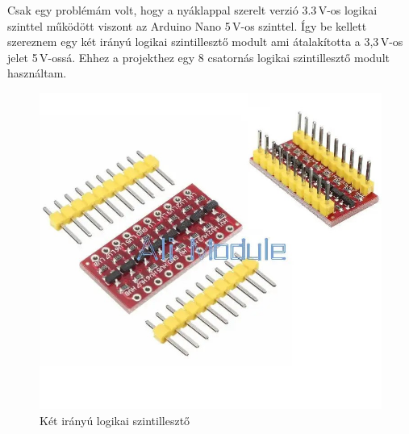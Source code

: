 \documentclass[]{thesis-ekf}
\theoremstyle{definition}
\theoremstyle{remark}
\begin{document}
Csak egy problémám volt, hogy a nyáklappal szerelt verzió 3.3\,V-os logikai szinttel működött viszont az Arduino Nano 5\,V-os szinttel. Így be kellett szereznem egy két irányú logikai szintillesztő\cite{szintilleszto} modult ami átalakította a 3,3\,V-os  jelet 5\,V-ossá. Ehhez a projekthez egy 8 csatornás logikai szintillesztő modult használtam.

\begin{figure}[th!]
	\centering
	\includegraphics[width=0.6\linewidth]{szintilleszto}
	\caption[Logikai szintillesztő]{Két irányú logikai szintillesztő}
	\label{fig:szintilleszto}
\end{figure}
\pagebreak
\end{document}
